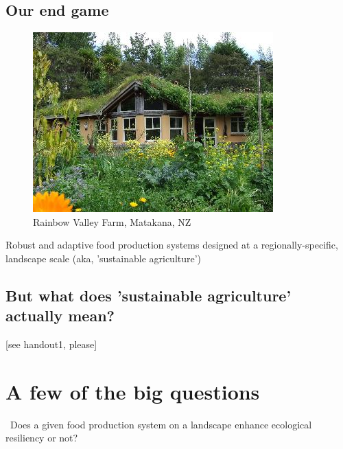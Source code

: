 \documentclass[
paper=128mm:96mm, %
fontsize=11pt, %
pagesize, %
parskip=half-, %
]{scrartcl} %
\theoremstyle{mythmstyle} %
\begin{document}
\clearpage
\subsection{Our end game}
\begin{figure}
\scriptsize 
\centering
\includegraphics[height=3.5 cm]{Image20.jpg}
\caption{\tiny Rainbow Valley Farm, Matakana, NZ}
\end{figure}
Robust and adaptive food production systems designed at a regionally-specific, landscape scale (aka, 'sustainable agriculture')

\clearpage
\subsection{But what does 'sustainable agriculture' actually mean?}
\small 
[see handout1, please]

\clearpage
\section{A few of the big questions}
\footnotesize 
\textasteriskcentered \ Does a given food production system on a landscape enhance ecological resiliency or not?



\clearpage
\end{document}
